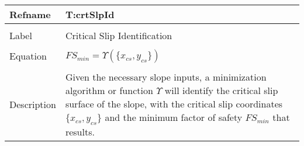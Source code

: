 \documentclass[12pt]{article}
\begin{document}
~\newline
\noindent \begin{minipage}{\textwidth}
\begin{tabular}{p{} p{}}
\toprule \textbf{Refname} & \textbf{T:crtSlpId}
\label{T:crtSlpId}
\\ \midrule \\
Label & Critical Slip Identification
\\ \midrule \\
Equation & ${FS_{min}}=Υ\left(\{{x_{cs}}{,y_{cs}}\}\right)$
\\ \midrule \\
Description & Given the necessary slope inputs, a minimization algorithm or function $Υ$ will identify the critical slip surface of the slope, with the critical slip coordinates $\{{x_{cs}}{,y_{cs}}\}$ and the minimum factor of safety ${FS_{min}}$ that results.
\\ \bottomrule \end{tabular}
\end{minipage}\\
\end{document}
